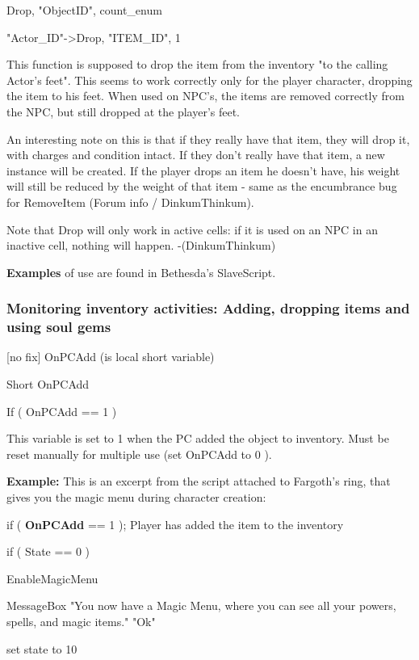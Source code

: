 \documentclass[
]{article}
\begin{document}
Drop, "ObjectID", count\_enum

"Actor\_ID"-\textgreater Drop, "ITEM\_ID", 1

This function is supposed to drop the item from the inventory "to the
calling Actor's feet". This seems to work correctly only for the player
character, dropping the item to his feet. When used on NPC's, the items
are removed correctly from the NPC, but still dropped at the player's
feet.

An interesting note on this is that if they really have that item, they
will drop it, with charges and condition intact. If they don't really
have that item, a new instance will be created. If the player drops an
item he doesn't have, his weight will still be reduced by the weight of
that item - same as the encumbrance bug for RemoveItem (Forum info /
DinkumThinkum).

Note that Drop will only work in active cells: if it is used on an NPC
in an inactive cell, nothing will happen. -(DinkumThinkum)

\textbf{Examples} of use are found in Bethesda's SlaveScript.

\hypertarget{monitoring-inventory-activities-adding-dropping-items-and-using-soul-gems}{%
\subsubsection{Monitoring inventory activities: Adding, dropping items
and using soul
gems}\label{monitoring-inventory-activities-adding-dropping-items-and-using-soul-gems}}

{[}no fix{]} OnPCAdd (is local short variable)

Short OnPCAdd

If ( OnPCAdd == 1 )

This variable is set to 1 when the PC added the object to inventory.
Must be reset manually for multiple use (set OnPCAdd to 0 ).

\textbf{Example:} This is an excerpt from the script attached to
Fargoth's ring, that gives you the magic menu during character creation:

if ( \textbf{OnPCAdd} == 1 ); Player has added the item to the inventory

if ( State == 0 )

EnableMagicMenu

MessageBox "You now have a Magic Menu, where you can see all your
powers, spells, and magic items." "Ok"

set state to 10
\end{document}
